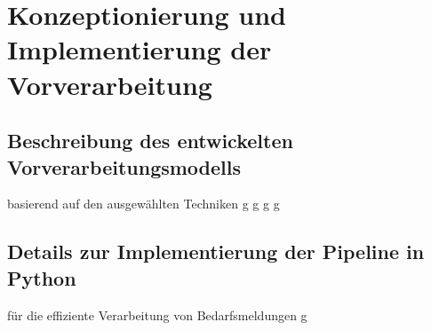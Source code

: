 \chapter{Konzeptionierung und Implementierung der Vorverarbeitung}
\label{chap:implementierung}

\section{Beschreibung des entwickelten Vorverarbeitungsmodells}
basierend auf den ausgewählten Techniken
\newpage
g
\newpage
g
\newpage
g
\newpage
g
\newpage

\section{Details zur Implementierung der Pipeline in Python}
für die effiziente Verarbeitung von Bedarfsmeldungen
\newpage
g
\newpage